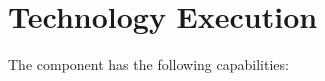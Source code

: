 \chapter{Technology Execution}\label{ch:ekg-mm-c-2}

The  component has the following capabilities:

\begin{itemize}[leftmargin=.5in]
\end{itemize}




